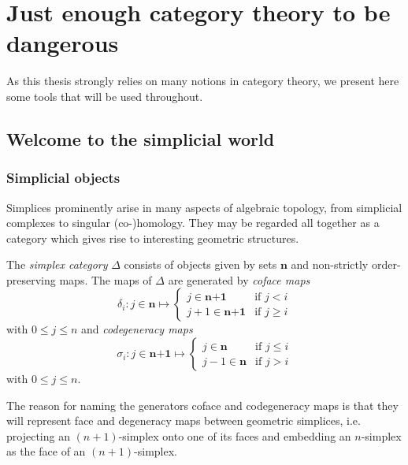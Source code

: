\section{Just enough category theory to be dangerous}
As this thesis strongly relies on many notions in category theory, we present here some tools that will be used throughout.

\subsection{Welcome to the simplicial world}

\subsubsection{Simplicial objects}
Simplices prominently arise in many aspects of algebraic topology, from simplicial complexes to singular (co-)homology. They may be regarded all together as a category which gives rise to interesting geometric structures.

\begin{definition}
    The \emph{simplex category} $\Delta$ consists of objects given by sets $\textbf{n}$ and non-strictly order-preserving maps.
    The maps of $\Delta$ are generated by \emph{coface maps} 
    \[ \delta_i : j \in \textbf{n} \mapsto 
    \begin{cases}
        j \in \textbf{n+1} & \text{if } j < i \\
        j + 1 \in \textbf{n+1} & \text{if } j \geq i
    \end{cases}
    \]
    with $0 \leq j \leq n$ and \emph{codegeneracy maps}
    \[
        \sigma_i : j \in \textbf{n+1} \mapsto \begin{cases}
            j \in \textbf{n} & \text{if } j \leq i \\
            j - 1 \in \textbf{n} & \text{if } j > i
        \end{cases}
    \]
    with $0 \leq j \leq n$.
\end{definition}

The reason for naming the generators coface and codegeneracy maps is that they will represent face and degeneracy maps between geometric simplices, i.e. projecting an $(n+1)$-simplex onto one of its faces and embedding an $n$-simplex as the face of an $(n+1)$-simplex.

